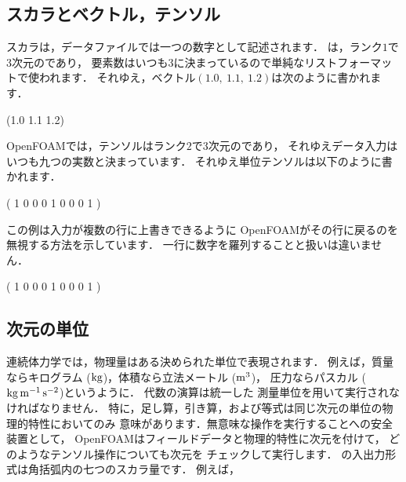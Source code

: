 \subsection{スカラとベクトル，テンソル}
\label{ssec:4.2.5}
スカラは，データファイルでは一つの数字として記述されます．
%
%
は，ランク$1$で3\nobreak 次元のであり，
要素数はいつも$3$に決まっているので単純なリストフォーマットで使われます．
それゆえ，ベクトル$(1.0,\ 1.1,\ 1.2)$は次のように書かれます．
\begin{OFverbatim}[file]
(1.0 1.1 1.2)
\end{OFverbatim}
OpenFOAMでは，テンソルはランク$2$で3\nobreak 次元のであり，
それゆえデータ入力はいつも九つの実数と決まっています．
それゆえ単位テンソルは以下のように書かれます．
\begin{OFverbatim}[file]
(
    1 0 0
    0 1 0
    0 0 1
)
\end{OFverbatim}
この例は入力が複数の行に上書きできるように
OpenFOAMがその行に戻るのを無視する方法を示しています．
一行に数字を羅列することと扱いは違いません．
\begin{OFverbatim}[file]
( 1 0 0 0 1 0 0 0 1 )
\end{OFverbatim}


\subsection{次元の単位}
\label{ssec:4.2.6}
%
連続体力学では，物理量はある決められた単位で表現されます．
例えば，質量ならキログラム ($\unit*{kg}$)，体積なら立法メートル ($\unit*{m^{3}}$)，
圧力ならパスカル ($\unit*{kg\,m^{-1}\,s^{-2}}$)というように．
代数の演算は統一した
%
測量単位を用いて実行されなければなりません．
特に，足し算，引き算，および等式は同じ次元の単位の物理的特性においてのみ
意味があります．無意味な操作を実行することへの安全装置として，
OpenFOAMはフィールドデータと物理的特性に次元を付けて，
どのようなテンソル操作についても次元を
%
チェックして実行します．
の入出力形式は角括弧内の七つのスカラ量です．
例えば，
\begin{OFverbatim}[file]
[0 2 -1 0 0 0 0]
\end{OFverbatim}

